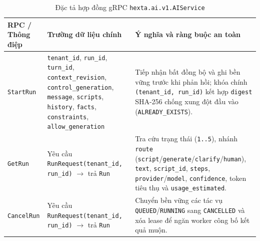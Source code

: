 \begin{table}[htbp]
  \centering
  \footnotesize
  \setlength{\tabcolsep}{4pt}
  \renewcommand{\arraystretch}{1.18}
  \caption{Đặc tả hợp đồng gRPC \texttt{hexta.\hspace{0pt}ai.\hspace{0pt}v1.\hspace{0pt}AIService}}\label{tab:grpc-contract}
  \begin{tabularx}{\linewidth}{@{}
    >{\raggedright\arraybackslash}p{2.2cm}
    >{\raggedright\arraybackslash}p{5.2cm}
    >{\raggedright\arraybackslash}X@{}}
    \toprule
    RPC / Thông điệp & Trường dữ liệu chính & Ý nghĩa và ràng buộc an toàn \\
    \midrule
    \texttt{StartRun} & \texttt{tenant\_\hspace{0pt}id}, \texttt{run\_\hspace{0pt}id}, \texttt{turn\_\hspace{0pt}id}, \texttt{context\_\hspace{0pt}revision}, \texttt{control\_\hspace{0pt}generation}, \texttt{message}, \texttt{scripts}, \texttt{history}, \texttt{facts}, \texttt{constraints}, \texttt{allow\_\hspace{0pt}generation} & Tiếp nhận bất đồng bộ và ghi bền vững trước khi phản hồi; khóa chính \texttt{(tenant\_\hspace{0pt}id, run\_\hspace{0pt}id)} kết hợp \texttt{digest} SHA-256 chống xung đột đầu vào (\texttt{ALREADY\_\hspace{0pt}EXISTS}). \\
    \texttt{GetRun} & Yêu cầu \texttt{RunRequest(tenant\_\hspace{0pt}id, run\_\hspace{0pt}id)} $\rightarrow$ trả \texttt{Run} & Tra cứu trạng thái (\texttt{1..5}), nhánh \texttt{route} (\texttt{script}/\texttt{generate}/\texttt{clarify}/\texttt{human}), \texttt{text}, \texttt{script\_\hspace{0pt}id}, \texttt{steps}, \texttt{provider}/\texttt{model}, \texttt{confidence}, token tiêu thụ và \texttt{usage\_\hspace{0pt}estimated}. \\
    \texttt{CancelRun} & Yêu cầu \texttt{RunRequest(tenant\_\hspace{0pt}id, run\_\hspace{0pt}id)} $\rightarrow$ trả \texttt{Run} & Chuyển bền vững các tác vụ \texttt{QUEUED}/\texttt{RUNNING} sang \texttt{CANCELLED} và xóa lease để ngăn worker công bố kết quả muộn. \\
    \bottomrule
  \end{tabularx}
\end{table}

